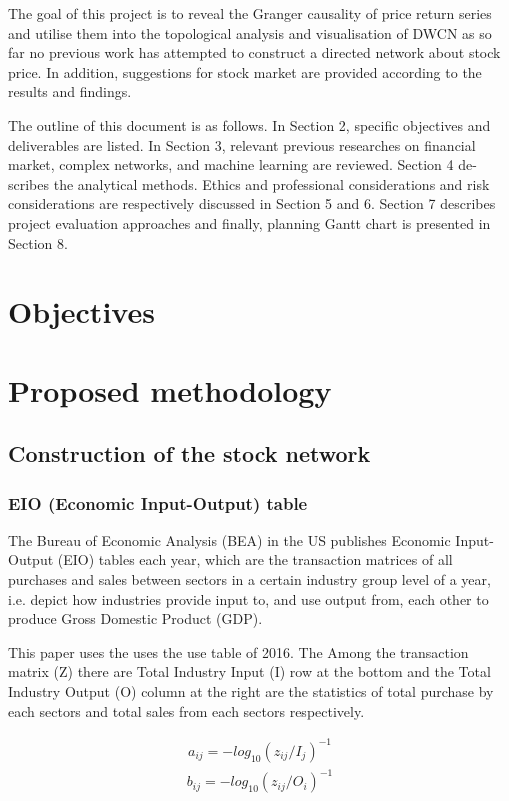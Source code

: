 The goal of this project is to reveal the Granger causality of price return series and utilise them into the topological analysis and visualisation of DWCN as so far no previous work has attempted to construct a directed network about stock price. In addition, suggestions for stock market are provided according to the results and findings.

The outline of this document is as follows. In Section 2, specific objectives and deliverables are listed. In Section 3, relevant previous researches on financial market, complex networks, and machine learning are reviewed. Section 4 de- scribes the analytical methods. Ethics and professional considerations and risk considerations are respectively discussed in Section 5 and 6. Section 7 describes project evaluation approaches and finally, planning Gantt chart is presented in Section 8.

\section{Objectives}

\section{Proposed methodology}
\subsection{Construction of the stock network}
\subsubsection{EIO (Economic Input-Output) table}

The Bureau of Economic Analysis (BEA) in the US publishes Economic Input-Output (EIO) tables each year, which are the transaction matrices of all purchases and sales between sectors in a certain industry group level of a year, i.e. depict how industries provide input to, and use output from, each other to produce Gross Domestic Product (GDP).

This paper uses the uses the use table of 2016. The Among the transaction matrix (Z) there are Total Industry Input (I) row at the bottom and the Total Industry Output (O) column at the right are the statistics of total purchase by each sectors and total sales from each sectors respectively.

\begin{eqnarray}\label{equ:eio_i}
a_{ij} = -log_{10}(z_{ij} / I_j)^{-1}
\end{eqnarray}
\begin{eqnarray}\label{equ:eio_o}
b_{ij} = -log_{10}(z_{ij} / O_i)^{-1}
\end{eqnarray}


